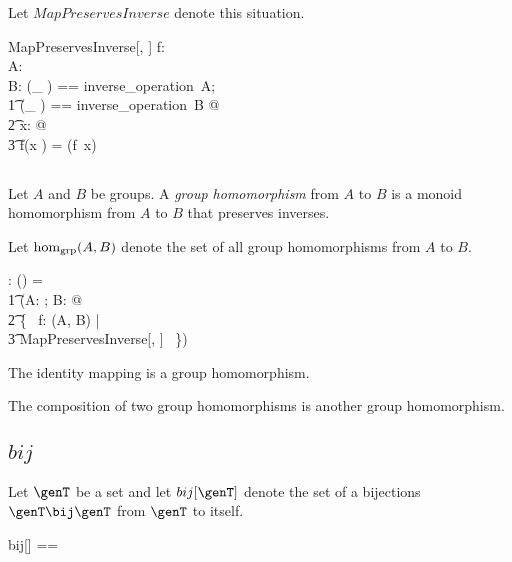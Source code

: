 \documentclass{amsart}
\begin{document}
Let $MapPreservesInverse$ denote this situation.

\begin{schema}{MapPreservesInverse}[\genT, \genU]
f: \genT \pfun \genU \\
A: \group \genT \\
B: \group \genU
\where
\LET (\_ \invG) == inverse\_operation~A; \\
\t1	(\_ \daggerG) == inverse\_operation~B @ \\
\t2		\forall x: \genT @ \\
\t3			f(x \invG) = (f~x) \daggerG
\end{schema}

\subsection{}

Let $A$ and $B$ be groups.
A {\em group homomorphism} from $A$ to $B$ is a monoid homomorphism
from $A$ to $B$ that preserves inverses.

Let $\operatorname{hom_{grp}}(A, B)$ denote the set of all group homomorphisms from $A$ to $B$.

\begin{gendef}[\genT, \genU]
\homGroup: \group \genT \cross \group \genU \fun \power (\genT \fun \genU)
\where
\homGroup = \\
\t1	(\lambda A: \group \genT; B: \group \genU @ \\
\t2		\{~ f: \homMonoid(A, B) | \\
\t3			MapPreservesInverse[\genT, \genU] ~\})
\end{gendef}

\begin{remark}
The identity mapping is a group homomorphism.
\end{remark}

\begin{remark}
The composition of two group homomorphisms is another group homomorphism.
\end{remark}

\subsection{$bij$}

Let $\genT$ be a set and let $bij[\genT]$ denote the set of a bijections $\genT \bij \genT$ from $\genT$ to itself.

\begin{zed}
	bij[\genT] == \genT \bij \genT
\end{zed}
\end{document}
